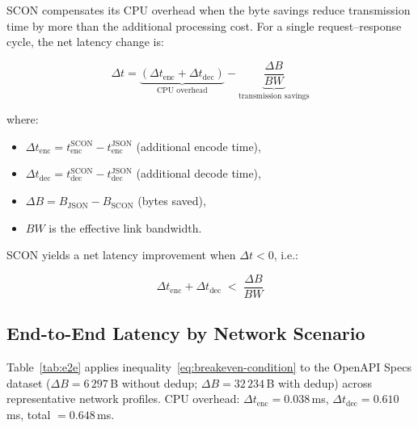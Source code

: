 \documentclass[11pt, a4paper]{article}
\begin{document}
SCON compensates its CPU overhead when the byte savings reduce transmission
time by more than the additional processing cost. For a single
request--response cycle, the net latency change is:

\begin{equation}
\label{eq:breakeven}
\Delta t = \underbrace{(\Delta t_{\text{enc}} + \Delta t_{\text{dec}})}_{\text{CPU overhead}}
         - \underbrace{\frac{\Delta B}{\mathit{BW}}}_{\text{transmission savings}}
\end{equation}

\noindent where:
\begin{itemize}
\item $\Delta t_{\text{enc}} = t_{\text{enc}}^{\text{SCON}} - t_{\text{enc}}^{\text{JSON}}$
      \quad (additional encode time),
\item $\Delta t_{\text{dec}} = t_{\text{dec}}^{\text{SCON}} - t_{\text{dec}}^{\text{JSON}}$
      \quad (additional decode time),
\item $\Delta B = B_{\text{JSON}} - B_{\text{SCON}}$
      \quad (bytes saved),
\item $\mathit{BW}$ is the effective link bandwidth.
\end{itemize}

\noindent SCON yields a net latency improvement when $\Delta t < 0$, i.e.:

\begin{equation}
\label{eq:breakeven-condition}
\boxed{\;\Delta t_{\text{enc}} + \Delta t_{\text{dec}} \;<\; \frac{\Delta B}{\mathit{BW}}\;}
\end{equation}

\subsection{End-to-End Latency by Network Scenario}
\label{sec:e2e}

Table~\ref{tab:e2e} applies inequality~\eqref{eq:breakeven-condition} to the
OpenAPI Specs dataset ($\Delta B = 6\,297$\,B without dedup;
$\Delta B = 32\,234$\,B with dedup) across representative network profiles.
CPU overhead: $\Delta t_{\text{enc}} = 0.038$\,ms,
$\Delta t_{\text{dec}} = 0.610$\,ms, total $= 0.648$\,ms.
\end{document}

